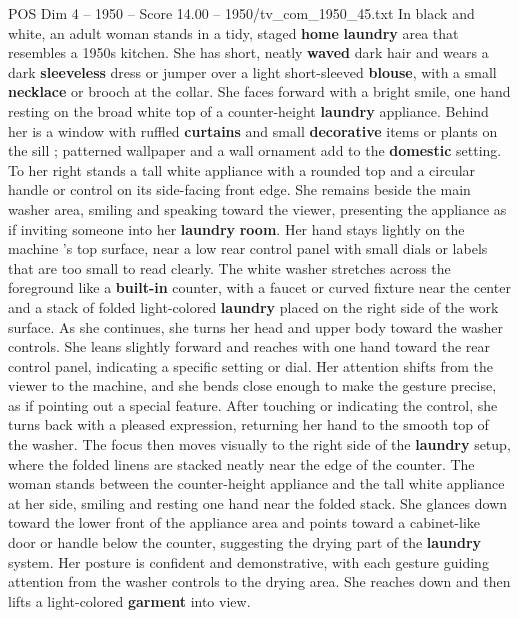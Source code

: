 \begin{textsample}{POS Dim 4 – 1950 – Score 14.00 – 1950/tv\_com\_1950\_45.txt}  \label{ex:f4_pos_038}
In black and white, an adult woman stands in a tidy, staged \textbf{home} \textbf{laundry} area that resembles a 1950s kitchen.
She has short, neatly \textbf{waved} dark hair and wears a dark \textbf{sleeveless} dress or jumper over a light short-sleeved \textbf{blouse}, with a small \textbf{necklace} or brooch at the collar.
She faces forward with a bright smile, one hand resting on the broad white top of a counter-height \textbf{laundry} appliance.
Behind her is a window with ruffled \textbf{curtains} and small \textbf{decorative} items or plants on the sill ; patterned wallpaper and a wall ornament add to the \textbf{domestic} setting.
To her right stands a tall white appliance with a rounded top and a circular handle or control on its side-facing front edge.
She remains beside the main washer area, smiling and speaking toward the viewer, presenting the appliance as if inviting someone into her \textbf{laundry} \textbf{room}.
Her hand stays lightly on the machine ’s top surface, near a low rear control panel with small dials or labels that are too small to read clearly.
The white washer stretches across the foreground like a \textbf{built-in} counter, with a faucet or curved fixture near the center and a stack of folded light-colored \textbf{laundry} placed on the right side of the work surface.
As she continues, she turns her head and upper body toward the washer controls.
She leans slightly forward and reaches with one hand toward the rear control panel, indicating a specific setting or dial.
Her attention shifts from the viewer to the machine, and she bends close enough to make the gesture precise, as if pointing out a special feature.
After touching or indicating the control, she turns back with a pleased expression, returning her hand to the smooth top of the washer.
The focus then moves visually to the right side of the \textbf{laundry} setup, where the folded linens are stacked neatly near the edge of the counter.
The woman stands between the counter-height appliance and the tall white appliance at her side, smiling and resting one hand near the folded stack.
She glances down toward the lower front of the appliance area and points toward a cabinet-like door or handle below the counter, suggesting the drying part of the \textbf{laundry} system.
Her posture is confident and demonstrative, with each gesture guiding attention from the washer controls to the drying area.
She reaches down and then lifts a light-colored \textbf{garment} into view.

\end{textsample}
